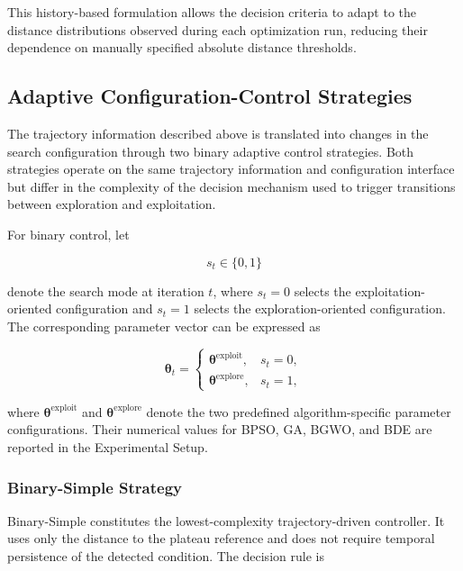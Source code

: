 \documentclass[journal,article,submit,moreauthors]{Definitions/mdpi}
\begin{document}
This history-based formulation allows the decision criteria to adapt to the
distance distributions observed during each optimization run, reducing
their dependence on manually specified absolute distance thresholds.


\subsection{Adaptive Configuration-Control Strategies}
\label{sec:adaptation_strategies}

The trajectory information described above is translated into changes in
the search configuration through two binary adaptive control strategies.
Both strategies operate on the same trajectory information and configuration
interface but differ in the complexity of the decision mechanism used to
trigger transitions between exploration and exploitation.

For binary control, let

\begin{equation}
s_t \in \{0,1\}
\end{equation}

denote the search mode at iteration $t$, where $s_t=0$ selects the
exploitation-oriented configuration and $s_t=1$ selects the
exploration-oriented configuration. The corresponding parameter vector can
be expressed as

\begin{equation}
\boldsymbol{\theta}_t =
\begin{cases}
\boldsymbol{\theta}^{\mathrm{exploit}}, & s_t=0,\\
\boldsymbol{\theta}^{\mathrm{explore}}, & s_t=1,
\end{cases}
\label{eq:binary_config}
\end{equation}

where $\boldsymbol{\theta}^{\mathrm{exploit}}$ and
$\boldsymbol{\theta}^{\mathrm{explore}}$ denote the two predefined
algorithm-specific parameter configurations. Their numerical values for
BPSO, GA, BGWO, and BDE are reported in the Experimental Setup.


\subsubsection{Binary-Simple Strategy}

Binary-Simple constitutes the lowest-complexity trajectory-driven controller.
It uses only the distance to the plateau reference and does not require
temporal persistence of the detected condition. The decision rule is
\end{document}
